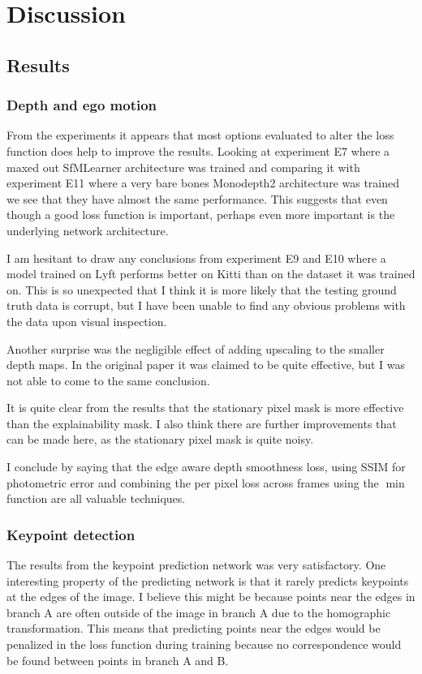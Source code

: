 \chapter{Discussion}\label{cha:discussion}

\section{Results}

\subsection{Depth and ego motion}

From the experiments it appears that most options evaluated to alter the loss function does help to improve the results. Looking at experiment E7 where a maxed out SfMLearner architecture was trained and comparing it with experiment E11 where a very bare bones Monodepth2 architecture was trained we see that they have almost the same performance. This suggests that even though a good loss function is important, perhaps even more important is the underlying network architecture.

I am hesitant to draw any conclusions from experiment E9 and E10 where a model trained on Lyft performs better on Kitti than on the dataset it was trained on. This is so unexpected that I think it is more likely that the testing ground truth data is corrupt, but I have been unable to find any obvious problems with the data upon visual inspection.

Another surprise was the negligible effect of adding upscaling to the smaller depth maps. In the original paper it was claimed to be quite effective, but I was not able to come to the same conclusion.

It is quite clear from the results that the stationary pixel mask is more effective than the explainability mask. I also think there are further improvements that can be made here, as the stationary pixel mask is quite noisy.

I conclude by saying that the edge aware depth smoothness loss, using SSIM for photometric error and combining the per pixel loss across frames using the $\min$ function are all valuable techniques.

\subsection{Keypoint detection}

The results from the keypoint prediction network was very satisfactory. One interesting property of the predicting network is that it rarely predicts keypoints at the edges of the image. I believe this might be because points near the edges in branch A are often outside of the image in branch A due to the homographic transformation. This means that predicting points near the edges would be penalized in the loss function during training because no correspondence would be found between points in branch A and B.

